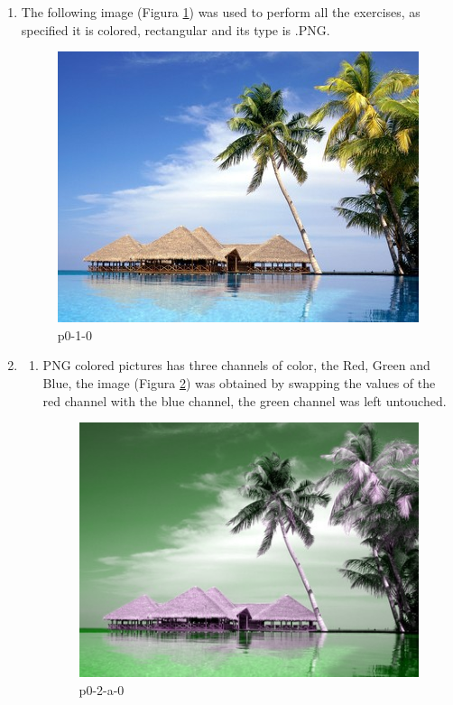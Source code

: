 \begin{enumerate}
\item The following image (Figura \ref{fig:p0-1-0}) was used to perform all the exercises, as specified it is colored, rectangular and its type is .PNG.\\

\begin{figure}[ht]
\centering
\includegraphics{input/p0-1-0}
\caption{p0-1-0}
\label{fig:p0-1-0}
\end{figure}

\item
\begin{enumerate}
\item PNG colored pictures has three channels of color, the Red, Green and Blue, the image (Figura \ref{fig:p0-2-a-0}) was obtained by swapping the values of the red channel with the blue channel, the green channel was left untouched.

\begin{figure}[ht]
\centering
\includegraphics{output/p0-2-a-0}
\caption{p0-2-a-0}
\label{fig:p0-2-a-0}
\end{figure}


\end{enumerate}
\end{enumerate}
